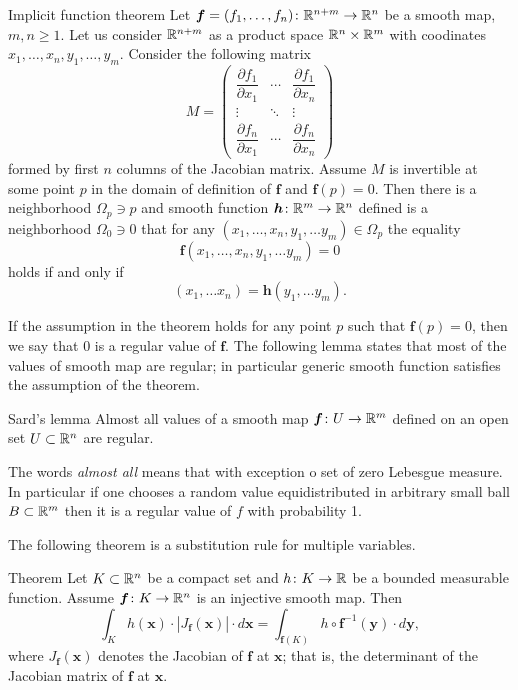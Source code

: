 \begin{thm}{Implicit function theorem}\label{thm:imlicit}
Let $\bm{f}=(f_1,\dots,f_n)\colon\mathbb{R}^{n+m}\to\mathbb{R}^n$ be a smooth map,
$m,n\ge 1$.
Let us consider $\mathbb{R}^{n+m}$ as a product space $\mathbb{R}^n\times \mathbb{R}^m$ with coodinates 
$x_1,\dots,x_n,y_1,\dots,y_m$.
Consider the following matrix 
\[
M=\begin{pmatrix}
\dfrac{\partial f_1}{\partial x_1} & \cdots & \dfrac{\partial f_1}{\partial x_n}\\
\vdots & \ddots & \vdots\\
\dfrac{\partial f_n}{\partial x_1} & \cdots & \dfrac{\partial f_n}{\partial x_n} \end{pmatrix}\]
formed by first $n$ columns of the Jacobian matrix.
Assume $M$ is invertible at some point $p$ in the domain of definition of $\bm{f}$ and $\bm{f}(p)=0$.
Then there is a neighborhood $\Omega_p\ni p$
and smooth function $\bm{h}\colon\mathbb{R}^m\to\mathbb{R}^n$ defined is a neighborhood $\Omega_0\ni 0$ that
for any $(x_1,\dots,x_n,y_1,\dots y_m)\in \Omega_p$ the equality
\[\bm{f}(x_1,\dots,x_n,y_1,\dots y_m)=0\]
holds if and only if 
\[(x_1,\dots x_n)=\bm{h}(y_1,\dots y_m).\]

\end{thm}

If the assumption in the theorem holds for any point $p$ such that $\bm{f}(p)=0$,
then we say that $0$ is a regular value of $\bm{f}$.
The following lemma states that most of the values of smooth map are regular;
in particular generic smooth function satisfies the assumption of the theorem.

\begin{thm}{Sard's lemma}\label{lem:sard}
Almost all values of a smooth map $\bm{f}\colon U \z\to \RR^m$ defined on an open set $U\subset \mathbb{R}^n$ are regular.
\end{thm}

The words \emph{almost all} means that with exception o set of zero Lebesgue measure.
In particular if one chooses a random value equidistributed in arbitrary small ball $B\subset \mathbb{R}^m$ then it is a regular value of $f$ with probability 1.

The following theorem is a substitution rule for multiple variables.

\begin{thm}{Theorem}\label{thm:mult-substitution}
Let $K\subset \mathbb{R}^n$ be a compact set and $h\colon K\to\mathbb{R}$ be a bounded measurable function.
Assume $\bm{f}\colon K\to \mathbb{R}^n$ is an injective smooth map.
Then 
\[\int_K h(\bm{x})\cdot |J_{\bm{f}}(\bm{x})|\cdot d\bm{x}
=
\int_{\bm{f}(K)} h\circ \bm{f}^{-1}(\bm{y})\cdot d\bm{y},\]
where $J_{\bm{f}}(\bm{x})$ denotes the Jacobian of $\bm{f}$ at $\bm{x}$;
that is, the determinant of the Jacobian matrix of $\bm{f}$ at $\bm{x}$.

\end{thm}


